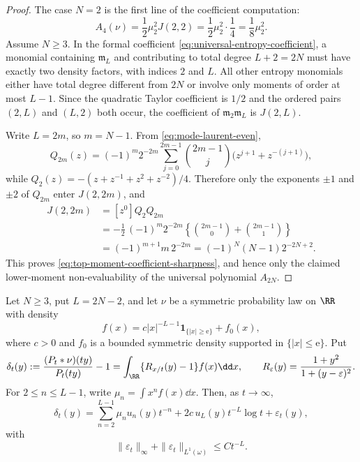 \begin{proof}
The case \(N=2\) is the first line of the coefficient computation:
\[
A_4(\nu)=\frac12\mu_2^2 J(2,2)
=\frac12\mu_2^2\cdot\frac14
=\frac18\mu_2^2 .
\]
Assume \(N\ge3\).  In the formal coefficient
\eqref{eq:universal-entropy-coefficient}, a monomial containing
\(\mathfrak m_L\) and contributing to total degree \(L+2=2N\) must have
exactly two density factors, with indices \(2\) and \(L\).  All other
entropy monomials either have total degree different from \(2N\) or involve
only moments of order at most \(L-1\).  Since the quadratic Taylor
coefficient is \(1/2\) and the ordered pairs \((2,L)\) and \((L,2)\) both
occur, the coefficient of \(\mathfrak m_2\mathfrak m_L\) is \(J(2,L)\).

Write \(L=2m\), so \(m=N-1\).  From
\eqref{eq:mode-laurent-even},
\[
Q_{2m}(z)=(-1)^m2^{-2m}
\sum_{j=0}^{2m-1}\binom{2m-1}{j}
\bigl(z^{j+1}+z^{-(j+1)}\bigr),
\]
while \(Q_2(z)=-(z+z^{-1}+z^2+z^{-2})/4\).  Therefore only the
exponents \(\pm1\) and \(\pm2\) of \(Q_{2m}\) enter \(J(2,2m)\), and
\[
\begin{aligned}
J(2,2m)
&=[z^0]Q_2Q_{2m}  \\
&=-\frac12\,(-1)^m2^{-2m}
\left\{\binom{2m-1}{0}+\binom{2m-1}{1}\right\}  \\
&=(-1)^{m+1}m\,2^{-2m}
=(-1)^N(N-1)2^{-2N+2}.
\end{aligned}
\]
This proves \eqref{eq:top-moment-coefficient-sharpness}, and hence only the
claimed lower-moment non-evaluability of the universal polynomial \(A_{2N}\).

\end{proof}

\begin{lemma}%
\label{lem:borderline-power-tail-quotient-expansion}
Let \(N\ge3\), put \(L=2N-2\), and let \(\nu\) be a symmetric probability
law on \(\RR\) with density
\[
f(x)=c|x|^{-L-1}\mathbf1_{\{|x|\ge \mathrm e\}}+f_0(x),
\]
where \(c>0\) and \(f_0\) is a bounded symmetric density supported in
\(\{|x|\le \mathrm e\}\).  Put
\[
\delta_t(y):=\frac{(P_t*\nu)(ty)}{P_t(ty)}-1
=\int_{\RR}\{R_{x/t}(y)-1\}f(x)\dd x,
\qquad
R_\varepsilon(y)=\frac{1+y^2}{1+(y-\varepsilon)^2}.
\]
For \(2\le n\le L-1\), write
\(\mu_n=\int x^n f(x)\dd x\).  Then, as \(t\to\infty\),
\begin{equation}\label{eq:borderline-power-tail-quotient-expansion}
\delta_t(y)=
\sum_{n=2}^{L-1}\mu_nu_n(y)t^{-n}
+2c\,u_L(y)t^{-L}\log t+\varepsilon_t(y),
\end{equation}
with
\begin{equation}\label{eq:borderline-power-tail-quotient-remainder}
\|\varepsilon_t\|_\infty+\|\varepsilon_t\|_{L^1(\omega)}
\le C t^{-L}.
\end{equation}
\end{lemma}


